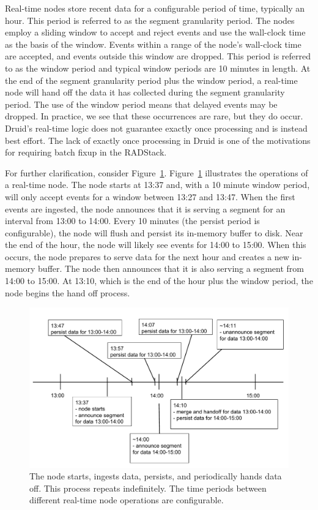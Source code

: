 \documentclass{vldb}
\begin{document}
Real-time nodes store recent data for a configurable period of time, typically
an hour. This period is referred to as the segment granularity period. The
nodes employ a sliding window to accept and reject events and use the
wall-clock time as the basis of the window. Events within a range of the node’s
wall-clock time are accepted, and events outside this window are dropped. This
period is referred to as the window period and typical window periods are 10
minutes in length. At the end of the segment granularity period plus the window
period, a real-time node will hand off the data it has collected during the
segment granularity period. The use of the window period means that delayed
events may be dropped. In practice, we see that these occurrences are rare, but
they do occur. Druid's real-time logic does not guarantee exactly once
processing and is instead best effort. The lack of exactly once processing in
Druid is one of the motivations for requiring batch fixup in the RADStack.

For further clarification, consider Figure~\ref{fig:realtime_timeline}.
Figure~\ref{fig:realtime_timeline} illustrates the operations of a real-time
node. The node starts at 13:37 and, with a 10 minute window period, will only
accept events for a window between 13:27 and 13:47.  When the first events are
ingested, the node announces that it is serving a segment for an
interval from 13:00 to 14:00. Every 10 minutes (the persist period is
configurable), the node will flush and persist its in-memory buffer to disk.
Near the end of the hour, the node will likely see events for 14:00 to 15:00.
When this occurs, the node prepares to serve data for the next hour and creates
a new in-memory buffer.  The node then announces that it is also serving a
segment from 14:00 to 15:00.  At 13:10, which is the end of the hour plus the
window period, the node begins the hand off process.

\begin{figure}
\centering
\includegraphics[width = 4.5in]{realtime_timeline}
\caption{The node starts, ingests data, persists, and periodically hands data
off. This process repeats indefinitely. The time periods between different
real-time node operations are configurable.}
\label{fig:realtime_timeline}
\end{figure}
\end{document}
